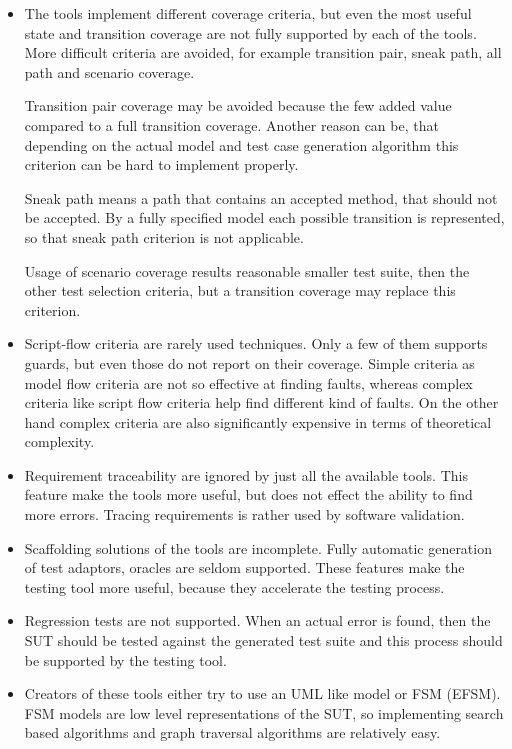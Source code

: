 \begin{itemize}
	\item The tools implement different coverage criteria, but even the most useful state and transition coverage are not fully supported by each of the tools. More difficult criteria are avoided, for example transition pair, sneak path, all path and scenario coverage.
	
	Transition pair coverage may be avoided because the few added value compared to a full transition coverage. Another reason can be, that depending on the actual model and test case generation algorithm this criterion can be hard to implement properly.
	
	Sneak path means a path that contains an accepted method, that should not be accepted. By a fully specified model each possible transition is represented, so that sneak path criterion is not applicable.
	
	Usage of scenario coverage results reasonable smaller test suite, then the other test selection criteria, but a transition coverage may replace this criterion.
	\item Script-flow criteria are rarely used techniques. Only a few of them supports guards, but even those do not report on their coverage. Simple criteria as model flow criteria are not so effective at finding faults, whereas complex criteria like script flow criteria help find different kind of faults. On the other hand complex criteria are also significantly expensive in terms of theoretical complexity.
	\item Requirement traceability are ignored by just all the available tools. This feature make the tools more useful, but does not effect the ability to find more errors. Tracing requirements is rather used by software validation.
	\item Scaffolding solutions of the tools are incomplete. Fully automatic generation of test adaptors, oracles are seldom supported. These features make the testing tool more useful, because they accelerate the testing process.
	\item Regression tests are not supported. When an actual error is found, then the SUT should be tested against the generated test suite and this process should be supported by the testing tool.
	\item Creators of these tools either try to use an UML like model or FSM (EFSM). FSM models are low level representations of the SUT, so implementing search based algorithms and graph traversal algorithms are relatively easy.
	

\end{itemize}
